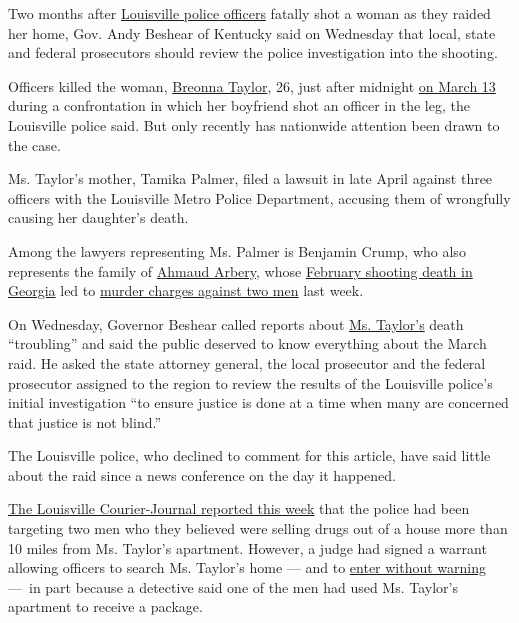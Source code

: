 Two months after
\href{https://www.nytimes3xbfgragh.onion/2020/06/19/us/brett-hankison-breonna-taylor-louisville.html}{Louisville
police officers} fatally shot a woman as they raided her home, Gov. Andy
Beshear of Kentucky said on Wednesday that local, state and federal
prosecutors should review the police investigation into the shooting.

Officers killed the woman,
\href{https://www.nytimes3xbfgragh.onion/2020/06/12/us/breonna-taylor-law-passed.html}{Breonna
Taylor}, 26, just after midnight
\href{https://www.courier-journal.com/story/news/crime/2020/03/13/louisville-police-officer-shot-suspect-killed-springfield-drive/5040349002/}{on
March 13} during a confrontation in which her boyfriend shot an officer
in the leg, the Louisville police said. But only recently has nationwide
attention been drawn to the case.

Ms. Taylor's mother, Tamika Palmer, filed a lawsuit in late April
against three officers with the Louisville Metro Police Department,
accusing them of wrongfully causing her daughter's death.

Among the lawyers representing Ms. Palmer is Benjamin Crump, who also
represents the family of
\href{https://www.nytimes3xbfgragh.onion/article/ahmaud-arbery-shooting-georgia.html}{Ahmaud
Arbery}, whose
\href{https://www.nytimes3xbfgragh.onion/2020/04/26/us/ahmed-arbery-shooting-georgia.html}{February
shooting death in Georgia} led to
\href{https://www.nytimes3xbfgragh.onion/2020/05/07/us/ahmaud-arbery-shooting-arrest.html}{murder
charges against two men} last week.

On Wednesday, Governor Beshear called reports about
\href{https://www.nytimes3xbfgragh.onion/2020/06/04/us/breonna-taylor-black-lives-matter-women.html}{Ms.
Taylor's} death ``troubling'' and said the public deserved to know
everything about the March raid. He asked the state attorney general,
the local prosecutor and the federal prosecutor assigned to the region
to review the results of the Louisville police's initial investigation
``to ensure justice is done at a time when many are concerned that
justice is not blind.''

The Louisville police, who declined to comment for this article, have
said little about the raid since a news conference on the day it
happened.

\href{https://www.courier-journal.com/story/news/2020/05/12/breonna-taylor-louisville-emt-not-main-target-drug-investigation/3115928001/}{The
Louisville Courier-Journal reported this week} that the police had been
targeting two men who they believed were selling drugs out of a house
more than 10 miles from Ms. Taylor's apartment. However, a judge had
signed a warrant allowing officers to search Ms. Taylor's home --- and
to
\href{https://www.nytimes3xbfgragh.onion/interactive/2017/03/18/us/forced-entry-warrant-drug-raid.html}{enter
without warning} ---~in part because a detective said one of the men had
used Ms. Taylor's apartment to receive a package.

